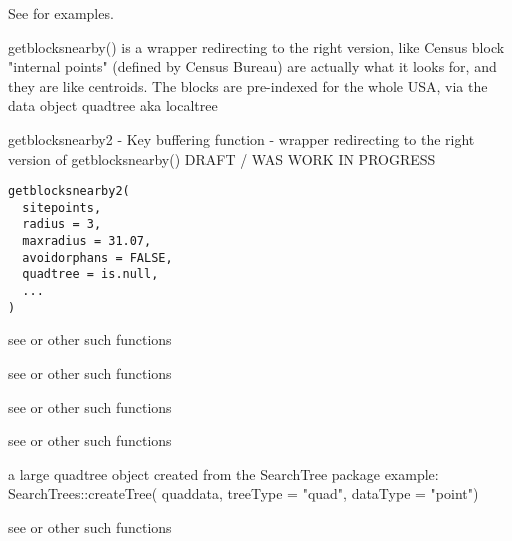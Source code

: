 \documentclass[a4paper]{book}
\begin{document}
%
\begin{Details}\relax
See  for examples.

getblocksnearby() is a wrapper redirecting to the right version, like 
Census block "internal points" (defined by Census Bureau) are actually what it looks for,
and they are like centroids.
The blocks are pre-indexed for the whole USA, via the data object quadtree aka localtree
\end{Details}
%
\begin{SeeAlso}\relax
{}    
\end{SeeAlso}
%
\begin{Description}\relax
getblocksnearby2 - Key buffering function - wrapper redirecting to the right version of getblocksnearby()
DRAFT / WAS WORK IN PROGRESS
\end{Description}
%
\begin{Usage}
\begin{verbatim}
getblocksnearby2(
  sitepoints,
  radius = 3,
  maxradius = 31.07,
  avoidorphans = FALSE,
  quadtree = is.null,
  ...
)
\end{verbatim}
\end{Usage}
%
\begin{Arguments}
\begin{ldescription}
\item[\code{sitepoints}] see  or other such functions

\item[\code{radius}] see  or other such functions

\item[\code{maxradius}] see  or other such functions

\item[\code{avoidorphans}] see  or other such functions

\item[\code{quadtree}] a large quadtree object created from the SearchTree package example:
SearchTrees::createTree( quaddata, treeType = "quad", dataType = "point")

\item[\code{...}] see  or other such functions
\end{ldescription}
\end{Arguments}
\end{document}
